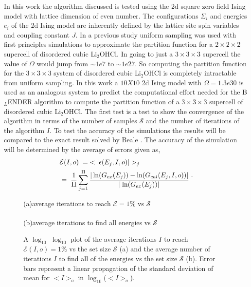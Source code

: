 \documentclass[aps,prl,reprint,superscriptaddress,showkeys]{revtex4-1}
\begin{document}
In this work the algorithm discussed is tested using the 2d square zero field  Ising model with lattice dimension of even number\cite{exact_statistical,Onsager,Ising}.  The configurations $\Sigma_i$ and energies $e_i$ of the 2d Ising model are inherently defined by the lattice site spin variables and coupling constant $J$. In a previous study\cite{partition} uniform sampling was used with first principles simulations to approximate the partition function for a $2\times 2\times 2$ supercell  of disordered cubic Li$_2$OHCl. In going to just a $3\times 3\times 3$ supercell the value of $\Omega$ would jump from $\sim 1e7$ to  $\sim 1e27$. So computing the partition function for the $3\times 3\times 3$ system of disordered cubic Li$_2$OHCl is completely intractable from uniform sampling. In this work a $10X10$ 2d Ising model with $\Omega = 1.3e30$ is used as an analogous system to predict the computational effort needed for the B$_L$ENDER algorithm to compute the partition function of a  $3\times 3\times 3$ supercell of disordered cubic Li$_2$OHCl.  The first test is a test to show the convergence of the algorithm in terms of the number of samples $\mathcal{S}$ and the number of iterations of the algorithm $I$. To test the accuracy of the simulations the results will be compared to the exact result solved by Beale \cite{Beale_2d_ising}. The accuracy of the simulation will be determined by the average of errors given as, 
\begin{equation}
\begin{split}
 &\mathcal{E}(I,o) \hspace{0.1cm}= \hspace{0.1cm}< |\epsilon(E_j,I,o)| >_j\\
& = \hspace{0.1cm}  \frac{1}{\Pi} \sum_{j=1}^{\Pi}\frac{|\ln(G_{ex}(E_j))- \ln(G_{cal}(E_j,I,o))|}{|\ln(G_{ex}(E_j))|}\; 
 \end{split}. 
\end{equation}
\begin{figure}[h!]
(a)\hspace{0.1cm}average iterations to reach $\mathcal{E}=1\%$ vs $\mathcal{S}$\\
\\
(b)\hspace{0.1cm}average iterations to find all energies vs $\mathcal{S}$\\
\caption{\label{its_to}A $\log_{10}$ $\log_{10}$  plot of the average iterations $I$ to reach $\mathcal{E}(I,o)=1\%$ vs the set size $\mathcal{S}$ (a) and the average number of iterations $I$ to find all of the energies vs the set size $\mathcal{S}$ (b). Error bars represent a linear propagation of the standard deviation of mean for $<I>_o$ in $\log_{10}$($<I>_o$). }
\end{figure}
\end{document}
